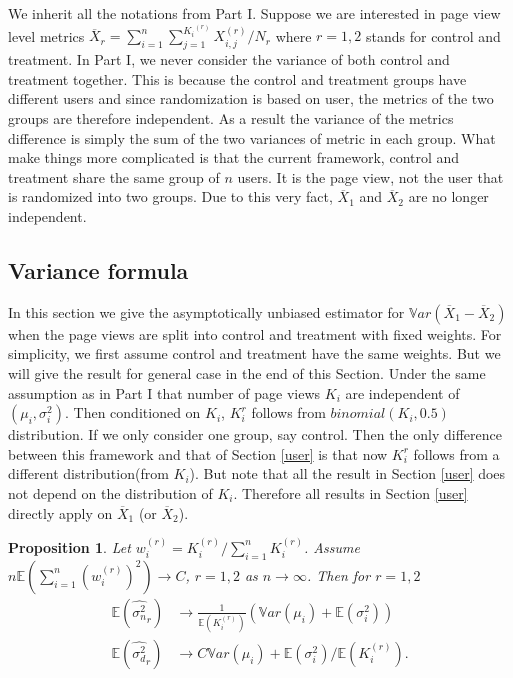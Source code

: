 \documentclass[10pt]{article}
\newcommand{\wht}{\widehat}
\newcommand{\var}{\ensuremath{\mathbb Var}}
\newcommand{\bbe}{\mathbb{E}}
\newcommand{\xbar}{\overline{X}}
\newcommand{\naiveest}{\wht{\sigma^2_n}}
\newcommand{\deltaest}{\wht{\sigma^2_d}}
\newtheorem{prop}[thm]{Proposition}
\begin{document}
We inherit all the notations from Part I. Suppose we are interested in page view level metrics $\xbar_r = \sum_{i=1}^n \sum_{j=1}^{{K_i}^{(r)}}X_{i,j}^{(r)}/N_r$ where $r=1,2$ stands for control and treatment. In Part I, we never consider the variance of both control and treatment together. This is because the control and treatment groups have different users and since randomization is based on user, the metrics of the two groups are therefore independent. As a result the variance of the metrics difference is simply the sum of the two variances of metric in each group.  What make things more complicated is that the current framework, control and treatment share the same group of $n$ users. It is the page view, not the user that is randomized into two groups. Due to this very fact, $\xbar_1$ and $\xbar_2$ are no longer independent. 


\subsection{Variance formula}
In this section we give the asymptotically unbiased estimator for $\var (\xbar_1-\xbar_2)$ when the page views are split into control and treatment with fixed weights. For simplicity, we first assume control and treatment have the same weights. But we will give the result for general case in the end of this Section. Under the same assumption as in Part I that number of page views $K_i$ are independent of $(\mu_i,\sigma_i^2)$. Then conditioned on $K_i$, $K_i^{r}$ follows from $binomial(K_i, 0.5)$ distribution. If we only consider one group, say control. Then the only difference between this framework and that of Section \ref{user} is that now $K_i^{r}$ follows from a different distribution(from $K_i$). But note that all the result in Section \ref{user} does not depend on the distribution of $K_i$. Therefore all results in Section \ref{user} directly apply on $\xbar_1$ (or $\xbar_2$). 

\begin{prop}\label{p_prop1}
Let $w_i^{(r)}=K_i^{(r)}/\sum_{i=1}^{n} K_i^{(r)} $. Assume $n\bbe (\sum_{i=1}^n {(w_i^{(r)})}^2)\to C$, $r=1,2$ as $n\to \infty$. Then for $r=1,2$
\begin{align}
\bbe(\naiveest_r) &\to  \frac{1}{\bbe(K_i^{(r)})} (\var(\mu_i)+\bbe(\sigma_i^2)) \label{p_naive}\\
\bbe (\deltaest_r) &\to C \var(\mu_i) + \bbe(\sigma^2_i)/\bbe (K_i^{(r)}) \label{p_delta}.
\end{align}
\end{prop}
\end{document}
